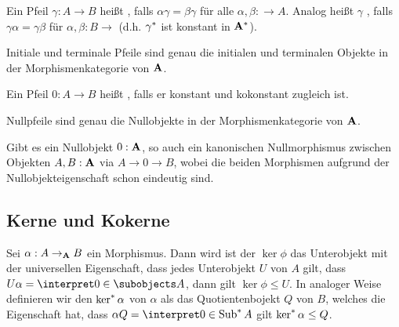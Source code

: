 \begin{definition}
    Ein Pfeil $\gamma:A\to B$ heißt , falls $\alpha\gamma=\beta\gamma$
    für alle $\alpha,\beta:\to A$. Analog heißt $\gamma$ , falls
    $\gamma\alpha=\gamma\beta$ für $\alpha,\beta:B\to$ (d.h. ${\gamma}^{\ast}$ ist konstant in ${\mathbf{A}}^{\ast}$).
\end{definition}

\begin{remark}
    Initiale und terminale Pfeile sind genau die initialen und terminalen Objekte in der Morphismenkategorie von $\mathbf{A}$. 
\end{remark}

\begin{definition}[Nullpfeil]
    Ein Pfeil $0:A\to B$ heißt , falls er konstant und kokonstant zugleich ist.
\end{definition}

\begin{remark}
    Nullpfeile sind genau die Nullobjekte in der Morphismenkategorie von $\mathbf{A}$.
\end{remark}

\begin{remark}
    Gibt es ein Nullobjekt $0:\mathbf{A}$, so auch ein kanonischen Nullmorphismus zwischen Objekten $A,B:\mathbf{A}$ via $A\to 0\to B$, wobei
    die beiden Morphismen aufgrund der Nullobjekteigenschaft schon eindeutig sind. 
\end{remark}


\subsection{Kerne und Kokerne}

\begin{definition}
Sei $\alpha:A\rightarrow_{\mathbf{A}} B$ ein Morphismus. Dann wird ist der  $\ker\phi$ das Unterobjekt mit der universellen Eigenschaft, dass jedes
Unterobjekt $U$ von $A$ gilt, dass $U\alpha=\interpret 0\in{\subobjects A}$, dann gilt $\ker\phi\leq U$.
In analoger Weise definieren wir den  $\mathop{{\mathrm{ker}}^{\ast}} \alpha$ von $\alpha$ als das Quotientenbojekt $Q$ von $B$, welches die
Eigenschaft hat, dass $\alpha Q=\interpret 0\in{\cosubobjects A}$ gilt $\mathop{{\mathrm{ker}}^{\ast}} \alpha\leq Q$.
\end{definition}

